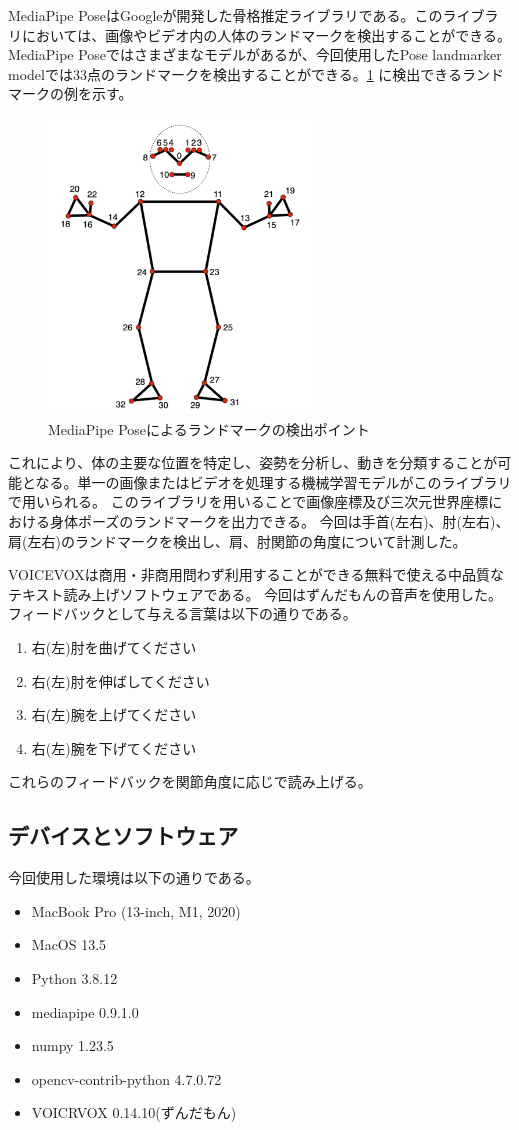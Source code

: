 MediaPipe Pose\cite{mediapipe_pose_landmarker}はGoogleが開発した骨格推定ライブラリである。このライブラリにおいては、画像やビデオ内の人体のランドマークを検出することができる。
MediaPipe Poseではさまざまなモデルがあるが、今回使用したPose landmarker modelでは33点のランドマークを検出することができる。\ref{fig:mediapipe} に検出できるランドマークの例を示す。
\begin{figure}[H]
  \begin{center}
    \includegraphics[width=7cm]{figures/mediapipe.png}
    \caption{MediaPipe Poseによるランドマークの検出ポイント}
    \label{fig:mediapipe}
  \end{center}
\end{figure}  
これにより、体の主要な位置を特定し、姿勢を分析し、動きを分類することが可能となる。単一の画像またはビデオを処理する機械学習モデルがこのライブラリで用いられる。
このライブラリを用いることで画像座標及び三次元世界座標における身体ポーズのランドマークを出力できる。
今回は手首(左右)、肘(左右)、肩(左右)のランドマークを検出し、肩、肘関節の角度について計測した。

VOICEVOXは商用・非商用問わず利用することができる無料で使える中品質なテキスト読み上げソフトウェアである。
今回はずんだもんの音声を使用した。
フィードバックとして与える言葉は以下の通りである。
\begin{enumerate}
  \item 右(左)肘を曲げてください
  \item 右(左)肘を伸ばしてください
  \item 右(左)腕を上げてください
  \item 右(左)腕を下げてください
\end{enumerate}
これらのフィードバックを関節角度に応じで読み上げる。

\subsection{デバイスとソフトウェア}
今回使用した環境は以下の通りである。
\begin{itemize}
  \item MacBook Pro (13-inch, M1, 2020)
  \item MacOS 13.5
  \item Python 3.8.12
  \item mediapipe 0.9.1.0
  \item numpy 1.23.5
  \item opencv-contrib-python 4.7.0.72
  \item VOICRVOX 0.14.10(ずんだもん)
\end{itemize}

